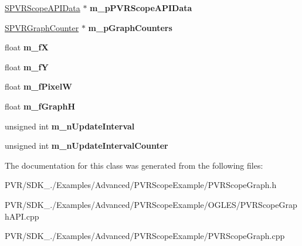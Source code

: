 \begin{DoxyCompactItemize}
\item 
\hypertarget{class_c_p_v_r_scope_graph_a37bacfb6535647e2de2f8dde82f4e178}{\hyperlink{struct_s_p_v_r_scope_a_p_i_data}{S\+P\+V\+R\+Scope\+A\+P\+I\+Data} $\ast$ {\bfseries m\+\_\+p\+P\+V\+R\+Scope\+A\+P\+I\+Data}}\label{class_c_p_v_r_scope_graph_a37bacfb6535647e2de2f8dde82f4e178}

\item 
\hypertarget{class_c_p_v_r_scope_graph_acb514cee63f3b4e9c67832e2bf618f48}{\hyperlink{struct_s_p_v_r_graph_counter}{S\+P\+V\+R\+Graph\+Counter} $\ast$ {\bfseries m\+\_\+p\+Graph\+Counters}}\label{class_c_p_v_r_scope_graph_acb514cee63f3b4e9c67832e2bf618f48}

\item 
\hypertarget{class_c_p_v_r_scope_graph_a3a30cb3ddb975aec2b3bccee6abafa14}{float {\bfseries m\+\_\+f\+X}}\label{class_c_p_v_r_scope_graph_a3a30cb3ddb975aec2b3bccee6abafa14}

\item 
\hypertarget{class_c_p_v_r_scope_graph_aac906bbb98c84bd047156b23a2e82316}{float {\bfseries m\+\_\+f\+Y}}\label{class_c_p_v_r_scope_graph_aac906bbb98c84bd047156b23a2e82316}

\item 
\hypertarget{class_c_p_v_r_scope_graph_ab565578e1a41483435cc19860dc76583}{float {\bfseries m\+\_\+f\+Pixel\+W}}\label{class_c_p_v_r_scope_graph_ab565578e1a41483435cc19860dc76583}

\item 
\hypertarget{class_c_p_v_r_scope_graph_aa0b1be015a74a4672aa154bc20afc8e3}{float {\bfseries m\+\_\+f\+Graph\+H}}\label{class_c_p_v_r_scope_graph_aa0b1be015a74a4672aa154bc20afc8e3}

\item 
\hypertarget{class_c_p_v_r_scope_graph_a79c88172b650af20f3289b3cb8d05241}{unsigned int {\bfseries m\+\_\+n\+Update\+Interval}}\label{class_c_p_v_r_scope_graph_a79c88172b650af20f3289b3cb8d05241}

\item 
\hypertarget{class_c_p_v_r_scope_graph_a853eb845731d905b1df9704143c42556}{unsigned int {\bfseries m\+\_\+n\+Update\+Interval\+Counter}}\label{class_c_p_v_r_scope_graph_a853eb845731d905b1df9704143c42556}

\end{DoxyCompactItemize}


The documentation for this class was generated from the following files\+:\begin{DoxyCompactItemize}
\item 
P\+V\+R/\+S\+D\+K\+\_./\+Examples/\+Advanced/\+P\+V\+R\+Scope\+Example/P\+V\+R\+Scope\+Graph.\+h\item 
P\+V\+R/\+S\+D\+K\+\_./\+Examples/\+Advanced/\+P\+V\+R\+Scope\+Example/\+O\+G\+L\+E\+S/P\+V\+R\+Scope\+Graph\+A\+P\+I.\+cpp\item 
P\+V\+R/\+S\+D\+K\+\_./\+Examples/\+Advanced/\+P\+V\+R\+Scope\+Example/P\+V\+R\+Scope\+Graph.\+cpp\end{DoxyCompactItemize}
